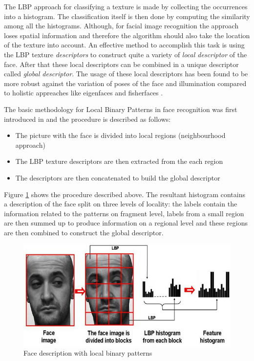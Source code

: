 \documentclass{report}
\begin{document}
The LBP approach for classifying a texture is made by collecting the occurrences into a histogram. The classification itself is then done by computing the similarity among all the histograms.
Although, for facial image recognition the approach loses spatial information and therefore the algorithm should also take the location of the texture into account.
An effective method to accomplish this task is using the LBP texture \textit{descriptors} to construct quite a variety of \textit{local descriptor} of the face.
After that these local descriptors can be combined in a unique descriptor called \textit{global descriptor}. The usage of these local descriptors has been found to be more robust against the variation of poses of the face and illumination compared to holistic appreaches like eigenfaces and fisherfaces \cite{parmar2014face}.

The basic methodology for Local Binary Patterns in face recognition was first introduced in \cite{ahonen2006face} and the procedure is described as follows:

\begin{itemize}
  \item The picture with the face is divided into local regions (neighbourhood approach)
  \item The LBP texture descriptors are then extracted from the each region
  \item The descriptors are then concatenated to build the global descriptor
\end{itemize}

Figure \ref{fig:lbp} shows the procedure described above. The resultant histogram contains a description of the face split on three levels of locality: the labels contain the information related to the patterns on fragment level, labels from a small region are then summed up to produce information on a regional level and these regions are then combined to construct the global descriptor.

\begin{figure}[htb]
  \centering
  \includegraphics[scale=1]{images/lbp.png}
  \caption{Face description with local binary patterns \cite{lbp-scholar}}
  \label{fig:lbp}
\end{figure}
\end{document}
